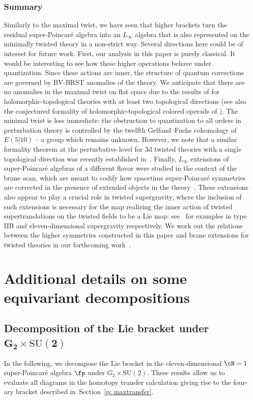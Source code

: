 \documentclass[10pt,a4paper]{amsart}
\numberwithin{equation}{section}
\theoremstyle{definition}
\def\SU{\ensuremath{\mathrm{SU}}}
\begin{document}
\subsubsection{Summary}
Similarly to the maximal twist, we have seen that higher brackets turn the residual super-Poincar\'e algebra into an $L_\infty$ algebra that is also represented on the minimally twisted theory in a non-strict way. Several directions here could be of interest for future work. First, our analysis in this paper is purely classical. It would be interesting to see how these higher operations behave under quantization. Since these actions are inner, the structure of quantum corrections are governed by BV-BRST anomalies of the theory. We anticipate that there are no anomalies in the maximal twist on flat space due to the results of \cite{williamswang} for holomorphic-topological theories with at least two topological directions (see also the conjectured formality of holomorphic-topological colored operads of \cite{Gaiotto:2024gii}). The minimal twist is less immediate: the obstruction to quantization to all orders in perturbation theory is controlled by the twelfth Gelfand--Fuchs cohomology of~$E(5|10)$ -- a group which remains unknown. However, we note that a similar formality theorem at the perturbative level for 3d twisted theories with a single topological direction was recently established in~\cite{Dimofte:2025oqf}. Finally, $L_\infty$ extensions of super-Poincar\'e algebras of a different flavor were studied in the context of the brane scan, which are meant to codify how spacetime super-Poincar\'e symmetries are corrected in the presence of extended objects in the theory~\cite{FSS}. These extensions also appear to play a crucial role in twisted supergravity, where the inclusion of such extensions is necessary for the map realizing the inner action of twisted supertranslations on the twisted fields to be a Lie map: see~\cite{CostelloLi, RSW} for examples in type IIB and eleven-dimensional supergravity respectively. We work out the relations between the higher symmetries constructed in this paper and brane extensions for twisted theories in our forthcoming work~\cite{twistedBranes}.


\appendix


\section{Additional details on some equivariant decompositions} \label{ap: details}

\subsection[Decomposition of the Lie bracket under G\_2 times SU(2)]{Decomposition of the Lie bracket under $\boldsymbol{ G_2 \times \SU(2)}$}
In the following, we decompose the Lie bracket in the eleven-dimensional $\cN=1$ super-Poincar\'e algebra $\fp$ under $G_2 \times \SU(2)$. These results allow us to evaluate all diagrams in the homotopy transfer calculation giving rise to the four-ary bracket described in~Section~\ref{p: maxtransfer}.
\end{document}
